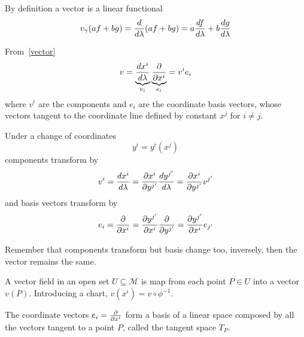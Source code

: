     By definition a vector is a linear functional
    \begin{equation*}
        v_\gamma (af + bg) = \frac{d}{d\lambda} (af+bg) = a \frac{df}{d\lambda} + b \frac{dg}{d\lambda}
    \end{equation*}

    From~\eqref{vector}
    \begin{equation*}
        v = \underbrace{\frac{dx^i}{d\lambda}}_{v_i} \underbrace{\frac{\partial}{\partial x^i}}_{e_i} = v^i e_i
    \end{equation*}
    where $v^i$ are the components and $e_i$ are the coordinate basis vectors, whose vectors tangent to the coordinate line defined by constant $x^j$ for $i \neq j$.

    Under a change of coordinates
    \begin{equation*}
        y^i = y^i(x^j)
    \end{equation*}
    components transform by 
    \begin{equation*}
        v^i = \frac{dx^i}{d\lambda} = \frac{\partial x^i}{\partial y^{j'}} \frac{dy^{j'}}{d\lambda} = \frac{\partial x^i}{\partial y^{j'}} v^{j'}
    \end{equation*}
    and basis vectors transform by 
    \begin{equation*}
        e_i = \frac{\partial}{\partial x^i} = \frac{\partial y^{j'}}{\partial x^i} \frac{\partial}{\partial y^{j'}} = \frac{\partial y^{j'}}{\partial x^i} e_{j'}
    \end{equation*}

    Remember that components transform but basis change too, inversely, then the vector remains the same.

    A vector field in an open set $U \subseteq \mathcal M$ is map from each point $P \in U$ into a vector $v(P)$. Introducing a chart, $v (x^i) = v \circ \phi^{-1}$.

    The coordinate vectors $e_i = \frac{\partial}{\partial x^i}$ form a basis of a linear space composed by all the vectors tangent to a point $P$, called the tangent space $T_P$.

